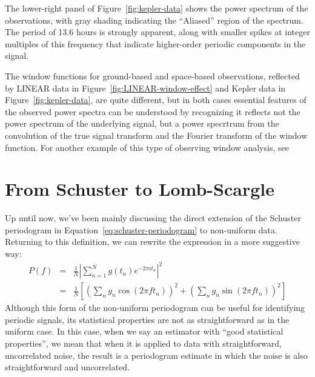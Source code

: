 \documentclass[preprint]{aastex}
\newcommand{\fig}[1]{Figure~\ref{fig:#1}}
\newcommand{\Eq}[1]{Equation~\ref{eq:#1}}
\newcommand{\eq}[1]{\Eq{#1}}
\newcommand{\eqlabel}[1]{\label{eq:#1}}
\newcommand{\sectlabel}[1]{\label{sect:#1}}
\begin{document}
The lower-right panel of \fig{kepler-data} shows the power spectrum of the
observations, with gray shading indicating the ``Aliased'' region of the
spectrum.
The period of 13.6 hours is strongly apparent, along with smaller spikes at
integer multiples of this frequency that indicate higher-order periodic
components in the signal.

The window functions for ground-based and space-based observations, reflected
by LINEAR data in \fig{LINEAR-window-effect} and Kepler data in
\fig{kepler-data}, are quite different, but in both cases essential features
of the observed power spectra can be understood by recognizing it reflects
not the power spectrum of the underlying signal, but a power specrtrum from
the convolution of the true signal transform and the Fourier transform of
the window function.
For another example of this type of observing window analysis, see
\citep{Deeming75}


\section{From Schuster to Lomb-Scargle}
\sectlabel{schuster-to-lomb-scargle}

Up until now, we've been mainly discussing the direct extension of the Schuster
periodogram in \eq{schuster-periodogram} to non-uniform data.
Returning to this definition, we can rewrite the expression in a more
suggestive way:
\begin{eqnarray}
  P(f)
  &=& \frac{1}{N}\left|\sum_{n=1}^N g(t_n)e^{-2\pi i t_n} \right|^2 \nonumber\\
  &=& \frac{1}{N}\left[
    \left(\sum_n g_n \cos(2\pi f t_n)\right)^2
    + \left(\sum_n g_n \sin(2\pi f t_n)\right)^2
    \right]
  \eqlabel{classical-periodogram}
\end{eqnarray}
Although this form of the non-uniform periodogram can be useful for identifying
periodic signals, its statistical properties are not as straightforward as in
the uniform case.
In this case, when we say an estimator with ``good statistical properties'',
we mean that when it is applied to data with straightforward, uncorrelated
noise, the result is a periodogram estimate in which the noise is also
straightforward and uncorrelated.
\end{document}
